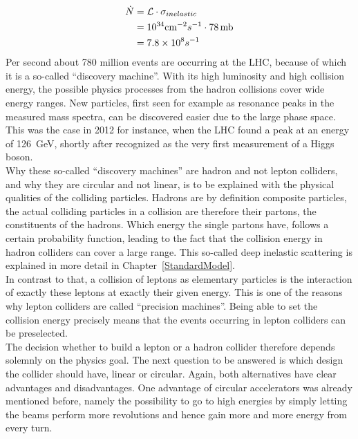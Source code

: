 \begin{align}
 \dot{N}&=\mathcal{L}\cdot\sigma_{inelastic}\\
 &=10^{34} \textrm{cm}^{-2}s^{-1} \cdot 78\textrm{\,mb}\\
 &=7.8\times 10^8 s^{-1}
\end{align}
Per second about 780 million events are occurring at the LHC, because of which it is a so-called ``discovery machine''.
With its high luminosity and high collision energy, the possible physics processes from the hadron collisions cover wide energy ranges.  
New particles, first seen for example as resonance peaks in the measured mass spectra, can be discovered easier due to the large phase space.
This was the case in 2012 for instance, when the LHC found a peak at an energy of \SI{126}{\GeV}, shortly after recognized as the very first measurement of a Higgs boson.~\cite{Higgs}\\
Why these so-called ``discovery machines'' are hadron and not lepton colliders, and why they are circular and not linear, is to be explained with the physical qualities of the colliding particles.
Hadrons are by definition composite particles, the actual colliding particles in a collision are therefore their partons, the constituents of the hadrons.
Which energy the single partons have, follows a certain probability function, leading to the fact that the collision energy in hadron colliders can cover a large range.
This so-called deep inelastic scattering is explained in more detail in Chapter~\ref{StandardModel}.\\
In contrast to that, a collision of leptons as elementary particles is the interaction of exactly these leptons at exactly their given energy.
This is one of the reasons why lepton colliders are called ``precision machines''.
Being able to set the collision energy precisely means that the events occurring in lepton colliders can be preselected.\\
The decision whether to build a lepton or a hadron collider therefore depends solemnly on the physics goal.
The next question to be answered is which design the collider should have, linear or circular.
Again, both alternatives have clear advantages and disadvantages.
One advantage of circular accelerators was already mentioned before, namely the possibility to go to high energies by simply letting the beams perform more revolutions and hence gain more and more energy from every turn.
